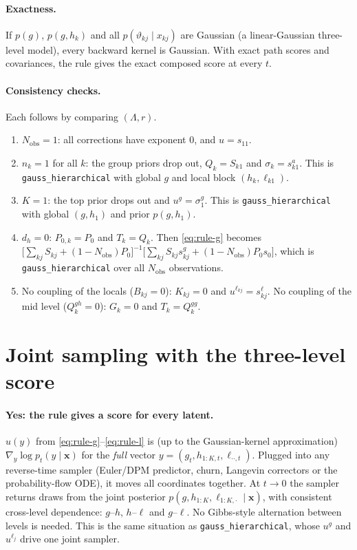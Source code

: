 \documentclass[11pt]{article}
\theoremstyle{definition}
\theoremstyle{remark}
\newcommand{\X}{\mathbf{x}}
\newcommand{\arrowm}{\texttt{gauss\_\allowbreak hierarchical}}
\newcommand{\hk}{h_k}
\newcommand{\lkj}{\ell_{kj}}
\newcommand{\vkj}{\vartheta_{kj}} %
\begin{document}
\paragraph{Exactness.} If $p(g)$, $p(g,\hk)$ and all $p(\vkj\mid x_{kj})$ are
Gaussian (a linear-Gaussian three-level model), every backward kernel is Gaussian.
With exact path scores and covariances, the rule gives the exact composed score
at every $t$.

\paragraph{Consistency checks.} Each follows by comparing $(\Lambda,r)$.
\begin{enumerate}
\item $N_\text{obs}=1$: all corrections have exponent $0$, and $u=s_{11}$.
\item $n_k=1$ for all $k$: the group priors drop out, $Q_k=S_{k1}$ and $\sigma_k=s^a_{k1}$.
 This is \arrowm{} with global $g$ and local block $(\hk,\ell_{k1})$.
\item $K=1$: the top prior drops out and $u^g=\sigma^g_1$. This is \arrowm{} with global
 $(g,h_1)$ and prior $p(g,h_1)$.
\item $d_h=0$: $P_{0,k}=P_0$ and $T_k=Q_k$. Then \eqref{eq:rule-g} becomes
 $\big[\sum_{kj}S_{kj}+(1-N_\text{obs})P_0\big]^{-1}\big[\sum_{kj}S_{kj}s^g_{kj}+(1-N_\text{obs})P_0s_0\big]$,
 which is \arrowm{} over all $N_\text{obs}$ observations.
\item No coupling of the locals ($B_{kj}=0$): $K_{kj}=0$ and $u^{\lkj}=s^\ell_{kj}$.
 No coupling of the mid level ($Q^{gh}_k=0$): $G_k=0$ and $T_k=Q^{gg}_k$.
\end{enumerate}

\section{Joint sampling with the three-level score}\label{sec:sampling}

\paragraph{Yes: the rule gives a score for every latent.} $u(y)$ from
\eqref{eq:rule-g}--\eqref{eq:rule-l} is (up to the Gaussian-kernel approximation)
$\nabla_y\log p_t(y\mid\X)$ for the \emph{full} vector
$y=(g_t,h_{1:K,t},\ell_{\cdot\cdot,t})$. Plugged into any reverse-time sampler
(Euler/DPM predictor, churn, Langevin correctors or the probability-flow ODE),
it moves all coordinates together. At $t\to0$ the sampler returns draws from the
joint posterior $p(g,h_{1:K},\ell_{1:K,\cdot}\mid\X)$, with consistent
cross-level dependence: $g$--$h$, $h$--$\ell$ and $g$--$\ell$. No Gibbs-style
alternation between levels is needed. This is the same situation as \arrowm,
whose $u^g$ and $u^{\ell_j}$ drive one joint sampler.
\end{document}
